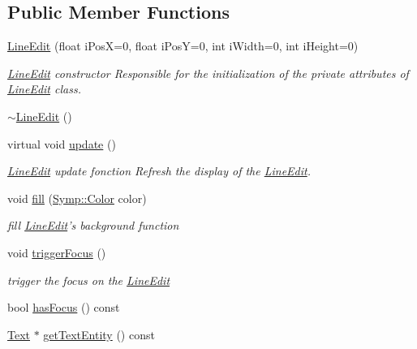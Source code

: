 \subsection*{Public Member Functions}
\begin{DoxyCompactItemize}
\item 
\hyperlink{class_symp_1_1_line_edit_aa712aa773e905c7e15f52825006ec65a}{Line\-Edit} (float i\-Pos\-X=0, float i\-Pos\-Y=0, int i\-Width=0, int i\-Height=0)
\begin{DoxyCompactList}\small\item\em \hyperlink{class_symp_1_1_line_edit}{Line\-Edit} constructor Responsible for the initialization of the private attributes of \hyperlink{class_symp_1_1_line_edit_aa712aa773e905c7e15f52825006ec65a}{Line\-Edit} class. \end{DoxyCompactList}\item 
\hyperlink{class_symp_1_1_line_edit_abf14f4506d3824a3facf759862cafd92}{$\sim$\-Line\-Edit} ()
\item 
virtual void \hyperlink{class_symp_1_1_line_edit_a7742de762d2f74e87050ee4086aec9ae}{update} ()
\begin{DoxyCompactList}\small\item\em \hyperlink{class_symp_1_1_line_edit}{Line\-Edit} update fonction Refresh the display of the \hyperlink{class_symp_1_1_line_edit_aa712aa773e905c7e15f52825006ec65a}{Line\-Edit}. \end{DoxyCompactList}\item 
void \hyperlink{class_symp_1_1_line_edit_a7a13f2488719889ef9e905060dfb1cb1}{fill} (\hyperlink{struct_symp_1_1_color}{Symp\-::\-Color} color)
\begin{DoxyCompactList}\small\item\em fill \hyperlink{class_symp_1_1_line_edit}{Line\-Edit}'s background function \end{DoxyCompactList}\item 
void \hyperlink{class_symp_1_1_line_edit_af18768be29c6cd58ebbc9ad37d3aeed7}{trigger\-Focus} ()
\begin{DoxyCompactList}\small\item\em trigger the focus on the \hyperlink{class_symp_1_1_line_edit}{Line\-Edit} \end{DoxyCompactList}\item 
bool \hyperlink{class_symp_1_1_line_edit_a69308c4c24f321dfe5078269aa6e6e47}{has\-Focus} () const 
\item 
\hyperlink{class_symp_1_1_text}{Text} $\ast$ \hyperlink{class_symp_1_1_line_edit_a387dcb8a797ab09456cfbdade58888e0}{get\-Text\-Entity} () const 

\end{DoxyCompactItemize}
